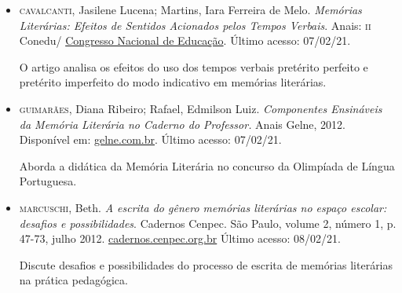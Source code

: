 \documentclass[11pt]{extarticle}
\begin{document}
\begin{itemize}
\item \textsc{cavalcanti}, Jasilene Lucena; Martins, Iara Ferreira de Melo.
\emph{Memórias Literárias: Efeitos de Sentidos Acionados pelos Tempos
Verbais}. Anais: \textsc{ii} Conedu/ \href{https://editorarealize.com.br/artigo/visualizar/16281}{Congresso Nacional de Educação}.
Último acesso: 07/02/21.

O artigo analisa os efeitos do uso dos tempos verbais pretérito perfeito e pretérito imperfeito do modo indicativo em memórias literárias. 

\item \textsc{guimarães}, Diana Ribeiro; Rafael, Edmilson Luiz. \emph{Componentes
Ensináveis da Memória Literária no Caderno do Professor.} Anais Gelne,
2012. Disponível em:
\href{http://www.gelne.com.br/arquivos/anais/gelne-2012/Arquivos/\%C3\%A1reas\%20tem\%C3\%A1ticas/Lingu\%C3\%ADstica\%20aplicada/Diana\%20e\%20Edmilson\%20-\%20COMPONENTES\%20ENSIN\%C3\%81VEIS\%20DA\%20MEM\%C3\%93RIA\%20LITER\%C3\%81RIA.pdf}{gelne.com.br}. Último acesso: 07/02/21.

Aborda a didática da Memória Literária no concurso da Olimpíada de Língua Portuguesa.

\item \textsc{marcuschi}, Beth. \emph{A escrita do gênero memórias literárias no espaço escolar: desafios e possibilidades}. Cadernos Cenpec. São Paulo, volume
2, número 1, p. 47-73, julho 2012. \href{http://www.cadernos.cenpec.org.br/cadernos/index.php/cadernos/article/view/92}{cadernos.cenpec.org.br} Último acesso: 08/02/21.

Discute desafios e possibilidades do processo de escrita de memórias literárias na prática pedagógica. 
\end{itemize}
\end{document}
